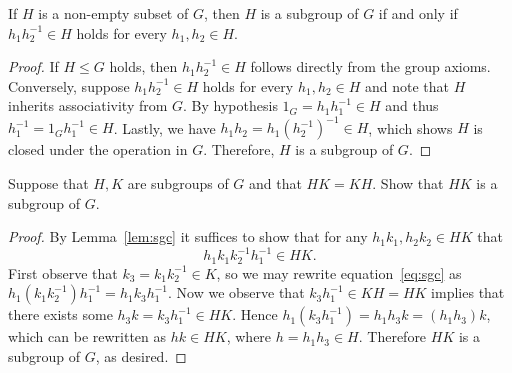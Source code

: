 \documentclass[10pt]{amsart}
\begin{document}
\begin{lem}\label{lem:sgc}
  If $H$ is a non-empty subset of $G$, then $H$ is a subgroup of $G$ if and only if $h_1h_2^{-1} \in H$ holds for every $h_1,h_2 \in H$.
  \begin{proof}
    If $H \leq G$ holds, then $h_1h_2^{-1} \in H$ follows directly from the group axioms.  
    Conversely, suppose $h_1h_2^{-1} \in H$ holds for every $h_1,h_2 \in H$ and note that $H$ inherits associativity from $G$.
    By hypothesis $1_G = h_1h_1^{-1} \in H$ and thus $h_1^{-1} = 1_Gh_1^{-1} \in H$.
    Lastly, we have $h_1h_2 = h_1(h_2^{-1})^{-1} \in H$, which shows $H$ is closed under the operation in $G$.
    Therefore, $H$ is a subgroup of $G$.
  \end{proof}
\end{lem}
\begin{thm}
  Suppose that $H,K$ are subgroups of $G$ and that $HK = KH$.  Show that $HK$ is a subgroup of $G$.
  \begin{proof}
    By Lemma~\ref{lem:sgc} it suffices to show that for any $h_1k_1,h_2k_2 \in HK$ that 
	\begin{equation}\label{eq:sgc}
		h_1k_1k_2^{-1}h_1^{-1} \in HK.
	\end{equation}
    First observe that $k_3 = k_1k_2^{-1} \in K$, so we may rewrite equation~\ref{eq:sgc} as $h_1(k_1k_2^{-1})h_1^{-1} = h_1k_3h_1^{-1}$.
    Now we observe that $k_3h_1^{-1} \in KH = HK$ implies that there exists some $h_3k = k_3h_1^{-1} \in HK$.
	Hence $h_1(k_3h_1^{-1}) = h_1h_3k = (h_1h_3)k$, which can be rewritten as $hk \in HK$, where $h = h_1h_3 \in H$.
	Therefore $HK$ is a subgroup of $G$, as desired.
  \end{proof}
\end{thm}
\end{document}
